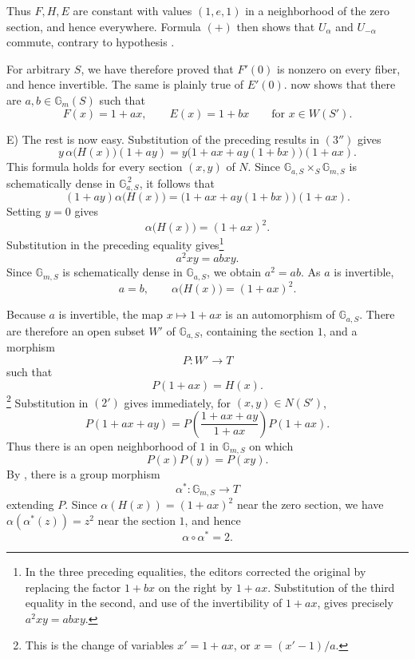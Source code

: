 Thus \(F,H,E\) are constant with values \((1,e,1)\) in a
neighborhood of the zero section, and hence everywhere. Formula
\((+)\) then shows that \(U_\alpha\) and \(U_{-\alpha}\) commute,
contrary to hypothesis \textup{}.

For arbitrary \(S\), we have therefore proved that \(F'(0)\) is
nonzero on every fiber, and hence invertible. The same is plainly
true of \(E'(0)\).  now shows that there are
\(a,b\in\mathbb G_m(S)\) such that
\begin{equation}\tag{\(\diamondsuit_1\)}
  F(x)=1+ax,\qquad E(x)=1+bx
  \qquad\text{for }x\in W(S').
\end{equation}

\textup{E)} The rest is now easy. Substitution of the preceding
results in \((3'')\) gives
\[
  y\,\alpha\bigl(H(x)\bigr)(1+ay)
   =y\bigl(1+ax+ay(1+bx)\bigr)(1+ax).
\]
This formula holds for every section \((x,y)\) of \(N\). Since
\(\mathbb G_{a,S}\times_S\mathbb G_{m,S}\) is schematically dense
in \(\mathbb G_{a,S}^{\,2}\), it follows that
\[
  (1+ay)\alpha\bigl(H(x)\bigr)
   =\bigl(1+ax+ay(1+bx)\bigr)(1+ax).
\]
Setting \(y=0\) gives
\[
  \alpha\bigl(H(x)\bigr)=(1+ax)^2.
\]
Substitution in the preceding equality gives\footnote{In the three
preceding equalities, the editors corrected the original by
replacing the factor \(1+bx\) on the right by \(1+ax\).
Substitution of the third equality in the second, and use of the
invertibility of \(1+ax\), gives precisely
\(a^2xy=abxy\).}
\[
  a^2xy=abxy.
\]
Since \(\mathbb G_{m,S}\) is schematically dense in
\(\mathbb G_{a,S}\), we obtain \(a^2=ab\). As \(a\) is invertible,
\begin{equation}\tag{\(\diamondsuit_2\)}
  a=b,\qquad \alpha\bigl(H(x)\bigr)=(1+ax)^2.
\end{equation}

Because \(a\) is invertible, the map \(x\mapsto1+ax\) is an
automorphism of \(\mathbb G_{a,S}\). There are therefore an open
subset \(W'\) of \(\mathbb G_{a,S}\), containing the section \(1\),
and a morphism
\[
  P\colon W'\longrightarrow T
\]
such that
\[
  P(1+ax)=H(x).
\]
\footnote{This is the change of variables
\(x'=1+ax\), or \(x=(x'-1)/a\).}
Substitution in \((2')\) gives immediately, for
\((x,y)\in N(S')\),
\[
  P(1+ax+ay)
   =P\left(\frac{1+ax+ay}{1+ax}\right)P(1+ax).
\]
Thus there is an open neighborhood of \(1\) in
\(\mathbb G_{m,S}\) on which
\[
  P(x)P(y)=P(xy).
\]
By , there is a group morphism
\begin{equation}\tag{\(\diamondsuit_3\)}
  \alpha^\ast\colon\mathbb G_{m,S}\longrightarrow T
\end{equation}
extending \(P\). Since
\(\alpha(H(x))=(1+ax)^2\) near the zero section, we have
\(\alpha(\alpha^\ast(z))=z^2\) near the section \(1\), and hence
\begin{equation}\tag{\(\diamondsuit_4\)}
  \alpha\circ\alpha^\ast=2.
\end{equation}

